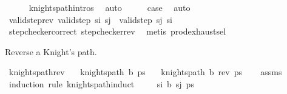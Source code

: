 \begin{isabellebody}
\ \ \ \ \isamarkupfalse%
\ knights{\isacharunderscore}{\kern0pt}path{\isachardot}{\kern0pt}intros\ \isamarkupfalse%
\ auto\isanewline
\ \ \isamarkupfalse%
\ \isamarkupfalse%
\ {\isacharquery}{\kern0pt}case\ \isamarkupfalse%
\ auto\isanewline
{}\isamarkupfalse%
%
\endisatagproof
{\isafoldproof}%
%
\isadelimproof
\isanewline
%
\endisadelimproof
\isanewline
{}\isamarkupfalse%
\ valid{\isacharunderscore}{\kern0pt}step{\isacharunderscore}{\kern0pt}rev{\isacharcolon}{\kern0pt}\ {\isachardoublequoteopen}valid{\isacharunderscore}{\kern0pt}step\ s\isactrlsub i\ s\isactrlsub j\ {\isasymLongrightarrow}\ valid{\isacharunderscore}{\kern0pt}step\ s\isactrlsub j\ s\isactrlsub i{\isachardoublequoteclose}\isanewline
%
\isadelimproof
\ \ %
\endisadelimproof
%
\isatagproof
{}\isamarkupfalse%
\ step{\isacharunderscore}{\kern0pt}checker{\isacharunderscore}{\kern0pt}correct\ step{\isacharunderscore}{\kern0pt}checker{\isacharunderscore}{\kern0pt}rev\ \isamarkupfalse%
\ {\isacharparenleft}{\kern0pt}metis\ prod{\isachardot}{\kern0pt}exhaust{\isacharunderscore}{\kern0pt}sel{\isacharparenright}{\kern0pt}%
\endisatagproof
{\isafoldproof}%
%
\isadelimproof
%
\endisadelimproof
%
\begin{isamarkuptext}%
Reverse a Knight's path.%
\end{isamarkuptext}\isamarkuptrue%
\isamarkupfalse%
\ knights{\isacharunderscore}{\kern0pt}path{\isacharunderscore}{\kern0pt}rev{\isacharcolon}{\kern0pt}\isanewline
\ \ \ {\isachardoublequoteopen}knights{\isacharunderscore}{\kern0pt}path\ b\ ps{\isachardoublequoteclose}\isanewline
\ \ \ {\isachardoublequoteopen}knights{\isacharunderscore}{\kern0pt}path\ b\ {\isacharparenleft}{\kern0pt}rev\ ps{\isacharparenright}{\kern0pt}{\isachardoublequoteclose}\isanewline
%
\isadelimproof
\ \ %
\endisadelimproof
%
\isatagproof
{}\isamarkupfalse%
\ assms\isanewline
{}\isamarkupfalse%
\ {\isacharparenleft}{\kern0pt}induction\ rule{\isacharcolon}{\kern0pt}\ knights{\isacharunderscore}{\kern0pt}path{\isachardot}{\kern0pt}induct{\isacharparenright}{\kern0pt}\isanewline
\ \ \isamarkupfalse%
\ {\isacharparenleft}{\kern0pt}{}\ s\isactrlsub i\ b\ s\isactrlsub j\ ps{\isacharparenright}{\kern0pt}\isanewline
\ \ \isamarkupfalse%
\ \isamarkupfalse%

\end{isabellebody}
